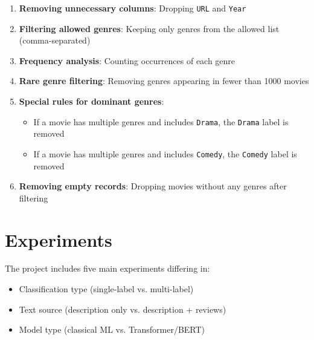 \documentclass[12pt,a4paper]{article}
\begin{document}
\begin{enumerate}

    \item \textbf{Removing unnecessary columns}: Dropping \texttt{URL} and \texttt{Year}

    \item \textbf{Filtering allowed genres}: Keeping only genres from the allowed list (comma-separated)

    \item \textbf{Frequency analysis}: Counting occurrences of each genre

    \item \textbf{Rare genre filtering}: Removing genres appearing in fewer than 1000 movies

    \item \textbf{Special rules for dominant genres}:

    \begin{itemize}

        \item If a movie has multiple genres and includes \texttt{Drama}, the \texttt{Drama} label is removed

        \item If a movie has multiple genres and includes \texttt{Comedy}, the \texttt{Comedy} label is removed

    \end{itemize}

    \item \textbf{Removing empty records}: Dropping movies without any genres after filtering

\end{enumerate}

\section{Experiments}

The project includes five main experiments differing in:

\begin{itemize}

    \item Classification type (single-label vs. multi-label)

    \item Text source (description only vs. description + reviews)

    \item Model type (classical ML vs. Transformer/BERT)

\end{itemize}
\end{document}
